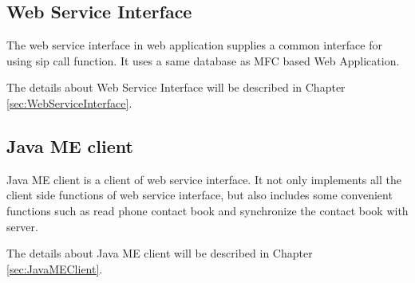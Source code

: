 \subsection{Web Service Interface}

The web service interface in web application supplies a common interface for using sip call function. It uses a same database as MFC based Web Application.

The details about Web Service Interface will be described in Chapter \ref{sec:WebServiceInterface}.

\subsection{Java ME client}

Java ME client is a client of web service interface. It not only implements all the client side functions of web service interface, but also includes some convenient functions such as read phone contact book and synchronize the contact book with server.

The details about Java ME client will be described in Chapter \ref{sec:JavaMEClient}.







